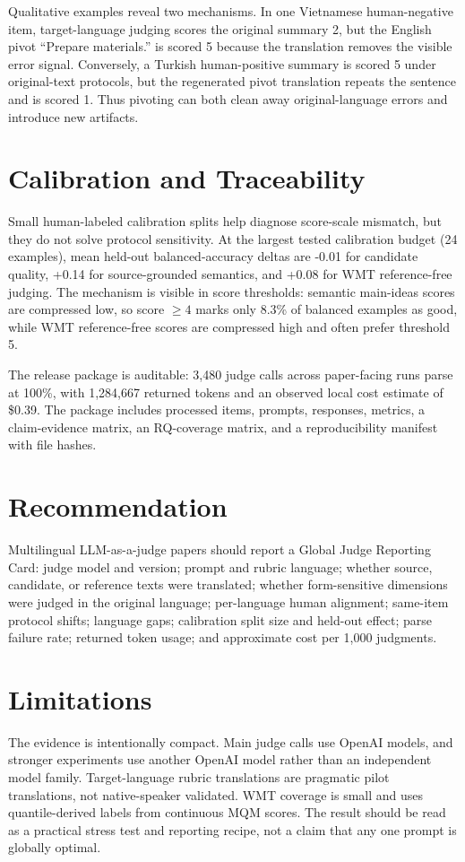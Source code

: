 \documentclass[10pt,twocolumn]{article}
\begin{document}
Qualitative examples reveal two mechanisms. In one Vietnamese human-negative item, target-language judging scores the original summary 2, but the English pivot ``Prepare materials.'' is scored 5 because the translation removes the visible error signal. Conversely, a Turkish human-positive summary is scored 5 under original-text protocols, but the regenerated pivot translation repeats the sentence and is scored 1. Thus pivoting can both clean away original-language errors and introduce new artifacts.

\section{Calibration and Traceability}
Small human-labeled calibration splits help diagnose score-scale mismatch, but they do not solve protocol sensitivity. At the largest tested calibration budget (24 examples), mean held-out balanced-accuracy deltas are -0.01 for candidate quality, +0.14 for source-grounded semantics, and +0.08 for WMT reference-free judging. The mechanism is visible in score thresholds: semantic main-ideas scores are compressed low, so score $\geq 4$ marks only 8.3\% of balanced examples as good, while WMT reference-free scores are compressed high and often prefer threshold 5.

The release package is auditable: 3,480 judge calls across paper-facing runs parse at 100\%, with 1,284,667 returned tokens and an observed local cost estimate of \$0.39. The package includes processed items, prompts, responses, metrics, a claim-evidence matrix, an RQ-coverage matrix, and a reproducibility manifest with file hashes.

\section{Recommendation}
Multilingual LLM-as-a-judge papers should report a Global Judge Reporting Card: judge model and version; prompt and rubric language; whether source, candidate, or reference texts were translated; whether form-sensitive dimensions were judged in the original language; per-language human alignment; same-item protocol shifts; language gaps; calibration split size and held-out effect; parse failure rate; returned token usage; and approximate cost per 1,000 judgments.

\section{Limitations}
The evidence is intentionally compact. Main judge calls use OpenAI models, and stronger experiments use another OpenAI model rather than an independent model family. Target-language rubric translations are pragmatic pilot translations, not native-speaker validated. WMT coverage is small and uses quantile-derived labels from continuous MQM scores. The result should be read as a practical stress test and reporting recipe, not a claim that any one prompt is globally optimal.



\end{document}
